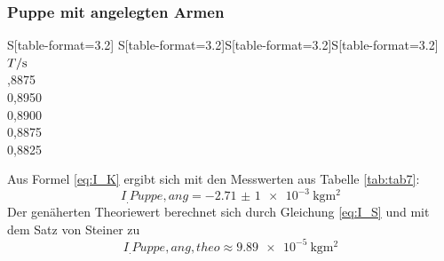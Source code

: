 \subsubsection{Puppe mit angelegten Armen}
\begin{table}
	\centering
	\caption{Messdaten zur Periodendauer einer Puppe mit angelegten Armen}
	\begin{tabular}{S[table-format=3.2] S[table-format=3.2]S[table-format=3.2]S[table-format=3.2]}
		\toprule
		{$T/\si[per-mode=reciprocal]{\second}$} \\
		,8875 \\
		 0,8950 \\
		 0,8900 \\
		 0,8875 \\
		 0,8825 \\
		\bottomrule
	\end{tabular}
	\label{tab:tab7}
\end{table}
\noindent Aus Formel \eqref{eq:I_K} ergibt sich mit den Messwerten aus Tabelle \ref{tab:tab7}:
\[I_.{Puppe,ang}=\SI{-2,71(1)e-3}{\kilogram\metre\squared}\]
Der genäherten Theoriewert berechnet sich durch Gleichung \eqref{eq:I_S} und mit dem Satz von Steiner zu
\[I_.{Puppe,ang,theo} \approx \SI{9,89e-5}{\kilogram\metre\squared} \]